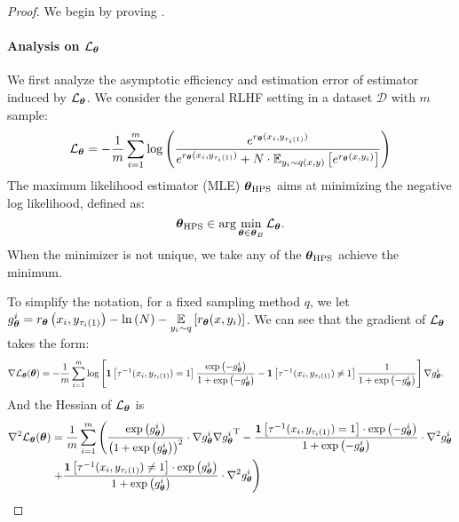 \begin{proof}
We begin by proving .
\paragraph{Analysis on $\mathcal{L}_{{\boldsymbol{\theta}}}$}
We first analyze the asymptotic efficiency and estimation error of estimator induced by $\mathcal{L}_{{\boldsymbol{\theta}}}$.
We consider the general RLHF setting in a dataset $\mathcal{D}$ with $m$ sample: 
\begin{equation*}
    \mathcal{L}_{{\boldsymbol{\theta}}}= -\frac{1}{m}\sum^{m}_{i=1}\log\left(\frac{e^{{ r_{{\boldsymbol{\theta}}}(x_{i},y_{\tau_{i}\left( 1\right)})}}}{e^{{ r_{{\boldsymbol{\theta}}}(x_{i},y_{\tau_{i}\left( 1\right)})}}+ N\cdot\operatorname*{\mathbb{E}}\nolimits_{y_{i} \sim q(x,y)}\left[e^{{r_{{\boldsymbol{\theta}}}(x,y_{i})}}\right]}\right)
\end{equation*}
The maximum likelihood estimator (MLE) ${\boldsymbol{\theta}}_{\text{HPS}}$ aims at minimizing the negative log likelihood, defined as: 
\begin{equation*}
{\boldsymbol{\theta}}_{\text{HPS}} \in \arg\min\limits_{{\boldsymbol{\theta}}\in{\boldsymbol{\theta}}_{B}}\mathcal{L}_{{\boldsymbol{\theta}}}.
\end{equation*}
When the minimizer is not unique, we take any of the ${\boldsymbol{\theta}}_{\text{HPS}}$ achieve the minimum.

To simplify the notation, for a fixed sampling method $q$, we let $g^{i}_{{\boldsymbol{\theta}}}=r_{{\boldsymbol{\theta}}}\left(x_{i},y_{\tau_{i}{\left(1\right)}}\right)-\ln\left(N\right)-\operatorname*{\mathbb{E}}\limits_{y_{i}\sim q}\left[{r_{{\boldsymbol{\theta}}}(x,y_{i})}\right]$.
We can see that the gradient of $\mathcal{L}_{{\boldsymbol{\theta}}}$ takes the form:
\begin{equation*}
\begin{aligned}
&\nabla \mathcal{L}_{{\boldsymbol{\theta}}}({\boldsymbol{\theta}})=-\frac{1}{m}\sum\limits^{m}_{i=1}\log\left[\mathbf{1}\left[\tau^{-1}(x_{i}, y_{\tau_{i}{\left(1\right)}})=1\right]\frac{\exp\left(-g^{i}_{{\boldsymbol{\theta}}}\right)}{1+\exp\left(-g^{i}_{{\boldsymbol{\theta}}}\right)}-\mathbf{1}\left[\tau^{-1}(x_{i}, y_{\tau_{i}{\left(1\right)}})\neq1\right]\frac{1}{1+\exp\left(-g^{i}_{{\boldsymbol{\theta}}}\right)}\right]\nabla g^{i}_{{\boldsymbol{\theta}}}.
\end{aligned}
\end{equation*}
And the Hessian of $\mathcal{L}_{{\boldsymbol{\theta}}}$ is
\begin{equation*}
\begin{aligned}
\nabla^{2} \mathcal{L}_{{\boldsymbol{\theta}}}({\boldsymbol{\theta}}) &= \frac{1}{m}\sum\limits^{m}_{i=1}\left(\frac{\exp\left(g^{i}_{{\boldsymbol{\theta}}}\right)}{\left(1+\exp\left(g^{i}_{{\boldsymbol{\theta}}}\right)\right)^{2}}\cdot\nabla g^{i}_{{\boldsymbol{\theta}}}\nabla {g^{i}_{{\boldsymbol{\theta}}}}^{\text{T}} -\frac{\mathbf{1}\left[\tau^{-1}(x_{i}, y_{\tau_{i}{\left(1\right)}})=1\right]\cdot\exp\left(-g^{i}_{{\boldsymbol{\theta}}}\right)}{1+\exp\left(-g^{i}_{{\boldsymbol{\theta}}}\right)}\cdot\nabla^{2} g^{i}_{{\boldsymbol{\theta}}} \right. \\
&\left.+\frac{\mathbf{1}\left[\tau^{-1}(x_{i}, y_{\tau_{i}{\left(1\right)}})\neq1\right]\cdot \exp\left(g^{i}_{{\boldsymbol{\theta}}}\right)}{1+\exp\left(g^{i}_{{\boldsymbol{\theta}}}\right)}\cdot\nabla^{2} g^{i}_{{\boldsymbol{\theta}}}\right)
\end{aligned}
\end{equation*}


\end{proof}
